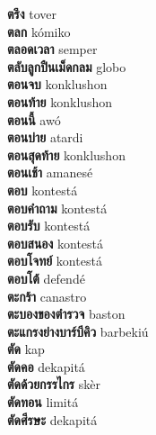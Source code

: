 \textbf{ ตรึง  } tover \\
\textbf{ ตลก  } kómiko \\
\textbf{ ตลอดเวลา  } semper \\
\textbf{ ตลับลูกปืนเม็ดกลม  } globo \\
\textbf{ ตอนจบ  } konklushon \\
\textbf{ ตอนท้าย  } konklushon \\
\textbf{ ตอนนี้  } awó \\
\textbf{ ตอนบ่าย  } atardi \\
\textbf{ ตอนสุดท้าย  } konklushon \\
\textbf{ ตอนเช้า  } amanesé \\
\textbf{ ตอบ  } kontestá \\
\textbf{ ตอบคำถาม  } kontestá \\
\textbf{ ตอบรับ  } kontestá \\
\textbf{ ตอบสนอง  } kontestá \\
\textbf{ ตอบโจทย์  } kontestá \\
\textbf{ ตอบโต้  } defendé \\
\textbf{ ตะกร้า  } canastro \\
\textbf{ ตะบองของตำรวจ  } baston \\
\textbf{ ตะแกรงย่างบาร์บีคิว  } barbekiú \\
\textbf{ ตัด  } kap \\
\textbf{ ตัดคอ  } dekapitá \\
\textbf{ ตัดด้วยกรรไกร  } skèr \\
\textbf{ ตัดทอน  } limitá \\
\textbf{ ตัดศีรษะ  } dekapitá \\
